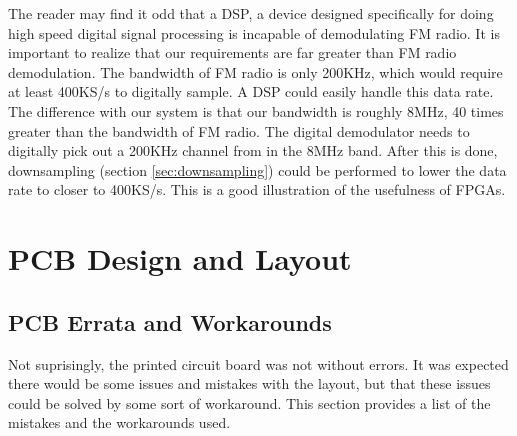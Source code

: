 \documentclass[a4paper, 12pt, notitlepage]{article}
\begin{document}
The reader may find it odd that a DSP, a device designed specifically for doing high speed digital signal processing is incapable of demodulating FM radio.  It is important to realize that our requirements are far greater than FM radio demodulation.  The bandwidth of FM radio is only 200KHz, which would require at least 400KS/s to digitally sample.  A DSP could easily handle this data rate.  The difference with our system is that our bandwidth is roughly 8MHz, 40 times greater than the bandwidth of FM radio.  The digital demodulator needs to digitally pick out a 200KHz channel from in the 8MHz band.  After this is done, downsampling (section \ref{sec:downsampling}) could be performed to lower the data rate to closer to 400KS/s.  This is a good illustration of the usefulness of FPGAs.


\section{PCB Design and Layout}
\label{sec:pcb_errata}
\subsection{PCB Errata and Workarounds}
Not suprisingly, the printed circuit board was not without errors.  It was expected there would be some issues and mistakes with the layout, but that these issues could be solved by some sort of workaround.  This section provides a list of the mistakes and the workarounds used.
\end{document}
